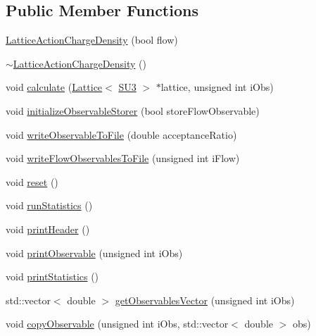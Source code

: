 \subsection*{Public Member Functions}
\begin{DoxyCompactItemize}
\item 
\mbox{\hyperlink{class_lattice_action_charge_density_acda2a43db75cca34586441d4ac7ec39e}{Lattice\+Action\+Charge\+Density}} (bool flow)
\item 
\mbox{\hyperlink{class_lattice_action_charge_density_a72679dfadb215889401f5403909b7b93}{$\sim$\+Lattice\+Action\+Charge\+Density}} ()
\item 
void \mbox{\hyperlink{class_lattice_action_charge_density_a3dddc75188042c645fbdd1c8b3e80c8a}{calculate}} (\mbox{\hyperlink{class_lattice}{Lattice}}$<$ \mbox{\hyperlink{class_s_u3}{S\+U3}} $>$ $\ast$lattice, unsigned int i\+Obs)
\item 
void \mbox{\hyperlink{class_lattice_action_charge_density_aba3131bbe5bd930adccc2852b4d44bb9}{initialize\+Observable\+Storer}} (bool store\+Flow\+Observable)
\item 
void \mbox{\hyperlink{class_lattice_action_charge_density_a719f71aaccbf1b4147ea944781d69908}{write\+Observable\+To\+File}} (double acceptance\+Ratio)
\item 
void \mbox{\hyperlink{class_lattice_action_charge_density_a54226556dc1497c311e4a4d50bf44c26}{write\+Flow\+Observables\+To\+File}} (unsigned int i\+Flow)
\item 
void \mbox{\hyperlink{class_lattice_action_charge_density_aebbc2cc72334e7b33d9cce2ad469280b}{reset}} ()
\item 
void \mbox{\hyperlink{class_lattice_action_charge_density_a21d608703811d2814e7f654588eaa0c0}{run\+Statistics}} ()
\item 
void \mbox{\hyperlink{class_lattice_action_charge_density_a2a7a806862f23975161316a37f47f22e}{print\+Header}} ()
\item 
void \mbox{\hyperlink{class_lattice_action_charge_density_abb7db718d4069faab0ed19f31aa85ad4}{print\+Observable}} (unsigned int i\+Obs)
\item 
void \mbox{\hyperlink{class_lattice_action_charge_density_abdaa497dd70dee58b810de7315241a56}{print\+Statistics}} ()
\item 
std\+::vector$<$ double $>$ \mbox{\hyperlink{class_lattice_action_charge_density_a72952fbe5ade96d53196d6c2c93896e5}{get\+Observables\+Vector}} (unsigned int i\+Obs)
\item 
void \mbox{\hyperlink{class_lattice_action_charge_density_aef63c9fba819e838a87b509d53be248b}{copy\+Observable}} (unsigned int i\+Obs, std\+::vector$<$ double $>$ obs)
\end{DoxyCompactItemize}
